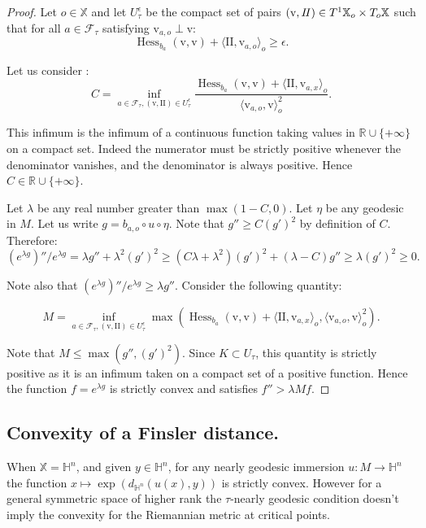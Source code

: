 \documentclass[reqno,10pt]{amsart}
\theoremstyle{plain}
\theoremstyle{definition}
\theoremstyle{remark}
\newcommand{\type}{\tau}
\newcommand{\R}{\mathbb{R}}
\DeclareMathOperator{\Hess}{Hess}
\newcommand{\II}{\mathrm{I\!I}}
\newcommand{\X}{\mathbb{X}}
\begin{document}
\begin{proof}

Let $o\in \X$ and let $U_\type^\epsilon$ be the compact set of pairs $(\mathrm{v},\mathrm\II)\in T^1\X_o\times T_o\X$ such that for all $a\in \mathcal{F}_\type$ satisfying $\mathrm{v}_{a,o}\perp\mathrm{v}$:
$$\Hess_{b_a}(\mathrm{v},\mathrm{v})+\langle\II,\mathrm{v}_{a,o}\rangle_o\geq\epsilon.$$

Let us consider :
$$C=\inf_{a\in \mathcal{F}_\type,(\mathrm{v},\II)\in U_\type^\epsilon}\frac{\Hess_{b_a}(\mathrm{v},\mathrm{v})+\langle\II,\mathrm{v}_{a,x}\rangle_o}{\langle \mathrm{v}_{a,o},\mathrm{v}\rangle_o^2}.$$

This infimum is the infimum of a continuous function taking values in $\R\cup \lbrace +\infty\rbrace $ on a compact set. Indeed the numerator must be strictly positive whenever the denominator vanishes, and the denominator is always positive. Hence $C\in \R\cup\lbrace +\infty\rbrace $. 

\medskip

Let $\lambda$ be any real number greater than $\max(1-C,0)$. Let $\eta$ be any geodesic in $M$. Let us write $g=b_{a,o}\circ u\circ \eta$. Note that $g''\geq C(g')^2$ by definition of $C$. Therefore:
$$\left(e^{\lambda g}\right)''/e^{\lambda g}=\lambda g''+\lambda^2 \left(g'\right)^2\geq  (C\lambda+\lambda^2)\left(g'\right)^2+(\lambda-C)g''\geq\lambda \left(g'\right)^2\geq 0.$$

Note also that $\left(e^{\lambda g}\right)''/e^{\lambda g}\geq \lambda g''$. Consider the following quantity:

 $$M=\inf_{a\in \mathcal{F}_\type,(\mathrm{v},\II)\in U_\type^\epsilon} \max\left(\Hess_{b_a}(\mathrm{v},\mathrm{v})+\langle\II,\mathrm{v}_{a,x}\rangle_o,\langle \mathrm{v}_{a,o},\mathrm{v}\rangle_o^2\right).$$ 
 
Note that $M\leq \max\left(g'',\left(g'\right)^2\right)$. Since $K\subset U_\type$, this quantity is strictly positive as it is an infimum taken on a compact set of a positive function. Hence the function $f=e^{\lambda g}$ is strictly convex and satisfies $f''>\lambda M f$.
\end{proof}

\subsection{Convexity of a Finsler distance.} 
\label{subsec:QIEmbedding}
When $\X=\mathbb{H}^n$, and given $y\in \mathbb{H}^n$, for any nearly geodesic immersion $u:M\to \mathbb{H}^n$ the function $x\mapsto \exp\left(d_{\mathbb{H}^n}(u(x),y)\right)$ is strictly convex. However for a general symmetric space of higher rank the $\type$-nearly geodesic condition doesn't imply the convexity for the Riemannian metric at critical points.
\end{document}
